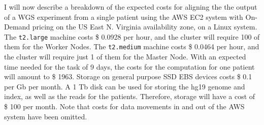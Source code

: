 \documentclass{article}
\begin{document}
I will now describe a breakdown of the expected costs for aligning the the output of a WGS experiment from a single patient using the AWS EC2 system with On-Demand pricing on the US East N. Virginia availability zone, on a Linux system.
The \texttt{t2.large} machine costs \$ 0.0928 per hour, and the cluster will require 100 of them for the Worker Nodes.
The \texttt{t2.medium} machine costs \$ 0.0464 per hour, and the cluster will require just 1 of them for the Master Node.
With an expected time needed for the task of 9 days, the costs for the computation for one patient will amount to \$ 1963.
Storage on general purpose SSD EBS devices costs \$ 0.1 per Gb per month.
A 1 Tb disk can be used for storing the hg19 genome and index, as well as the reads for the patients.
Therefore, storage will have a cost of \$ 100 per month.
Note that costs for data movements in and out of the AWS system have been omitted.
\end{document}
